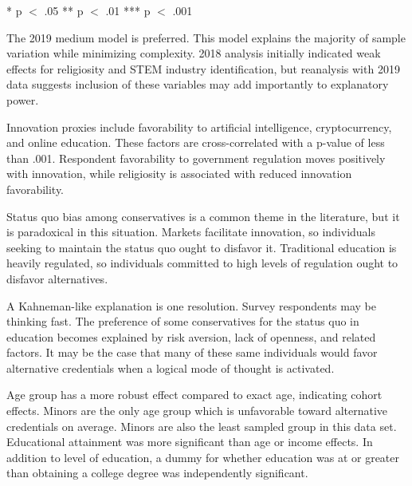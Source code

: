 \documentclass[review]{elsarticle}
\begin{document}
\begin{table}
\begin{tabular}{lllll}
            \end{tabular}
            \begin{tablenotes}
                \item{
                    * p $<$ .05
                    ** p $<$ .01
                    *** p $<$ .001
                }
            \end{tablenotes}
            \label{tab:models}
            \end{table}
        
        The 2019 medium model is preferred. This model explains the majority of sample variation
        while minimizing complexity.
        2018 analysis initially indicated weak effects for religiosity and STEM industry identification,
        but reanalysis with 2019 data suggests inclusion of these variables may add importantly to
        explanatory power.
        
        Innovation proxies include favorability to artificial
        intelligence, cryptocurrency, and online education. These factors are
        cross-correlated with a p-value of less than .001.
        Respondent favorability to government regulation moves positively with
        innovation, while religiosity is associated with reduced
        innovation favorability.
        
        Status quo bias among conservatives is a common theme in the literature\cite{eidelman2012bias},
        but it is paradoxical in this situation.
        Markets facilitate innovation\cite{baumol2002free},
        so individuals seeking to maintain the status quo ought to disfavor it.
        Traditional education is heavily regulated,
        so individuals committed to high levels of regulation ought to disfavor
        alternatives.

        A Kahneman-like explanation is one resolution.
        Survey respondents may be thinking fast\cite{kahneman2011thinking}.
        The preference of some conservatives for the status quo in education becomes explained by
        risk aversion, lack of openness, and related factors.
        It may be the case that many of these same individuals would favor alternative
        credentials when a logical mode of thought is activated.
        
        Age group has a more robust effect compared to exact age, indicating cohort effects.
        Minors are the only age group which is unfavorable toward alternative credentials on average.
        Minors are also the least sampled group in this data set.
        Educational attainment was more significant than age or income effects.
        In addition to level of education, a dummy for whether education was at or greater than
        obtaining a college degree was independently significant.
        
\end{document}
